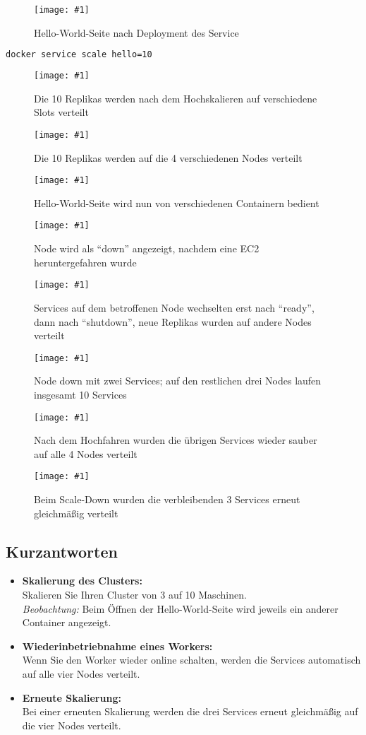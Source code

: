 \documentclass[BMR,Seminar,ngerman,IEEE]{twbook}
\newcommand{\screenshotH}[3]{%
  \begin{figure}[H]
    \centering
    \texttt{[image: \#1]}%
    \caption{#2}%
    \label{fig:#3}%
  \end{figure}%
}
\begin{document}
\screenshotH{hello_world.png}{Hello-World-Seite nach Deployment des Service}{hello-world}
\FloatBarrier

\begin{lstlisting}[language=bash]
docker service scale hello=10
\end{lstlisting}

\screenshotH{10_replicas.png}{Die 10 Replikas werden nach dem Hochskalieren auf verschiedene Slots verteilt}{ten-replicas}
\FloatBarrier
\screenshotH{portainer_cluster_10rep.png}{Die 10 Replikas werden auf die 4 verschiedenen Nodes verteilt}{distribution-10-replicas}
\FloatBarrier

\screenshotH{hello_world_two_containers.png}{Hello-World-Seite wird nun von verschiedenen Containern bedient}{hello-world-2-containers}
\FloatBarrier

\screenshotH{shutdown node.png}{Node wird als \enquote{down} angezeigt, nachdem eine EC2 heruntergefahren wurde}{shutdown-instance}
\FloatBarrier

\screenshotH{services_ready_status.png}{Services auf dem betroffenen Node wechselten erst nach \enquote{ready}, dann nach \enquote{shutdown}, neue Replikas wurden auf andere Nodes verteilt}{status-ready}
\FloatBarrier
\screenshotH{portainer_down_but10.png}{Node down mit zwei Services; auf den restlichen drei Nodes laufen insgesamt 10 Services}{node-down-10-services}
\FloatBarrier

\screenshotH{shutdown_services.png}{Nach dem Hochfahren wurden die übrigen Services wieder sauber auf alle 4 Nodes verteilt}{still-shutdown}
\FloatBarrier

\screenshotH{portainer_scale_down.png}{Beim Scale-Down wurden die verbleibenden 3 Services erneut gleichmäßig verteilt}{scale-down}
\FloatBarrier

\subsection{Kurzantworten}
\begin{itemize}[leftmargin=*]
  \item \textbf{Skalierung des Clusters:}\\
  Skalieren Sie Ihren Cluster von 3 auf 10 Maschinen.\\
  \textit{Beobachtung:} Beim Öffnen der Hello-World-Seite wird jeweils ein anderer Container angezeigt.
  \item \textbf{Wiederinbetriebnahme eines Workers:}\\
  Wenn Sie den Worker wieder online schalten, werden die Services automatisch auf alle vier Nodes verteilt.
  \item \textbf{Erneute Skalierung:}\\
  Bei einer erneuten Skalierung werden die drei Services erneut gleichmäßig auf die vier Nodes verteilt.
\end{itemize}
\end{document}
